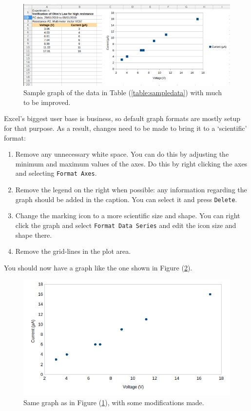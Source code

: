 \begin{figure}[!htb]
    \centering
    \includegraphics[scale=0.75]{figs/samplegraph1.png}
    \caption{Sample graph of the data in Table (\ref{table:sampledata}) with much to be improved.}
    \label{fig:samplegraph1}
\end{figure}


Excel's biggest user base is business, so default graph formats are mostly setup for that purpose. As a result, changes need to be made to bring it to a `scientific' format: \begin{enumerate}
    \item Remove any unnecessary white space. You can do this by adjusting the minimum and maximum values of the axes. Do this by right clicking the axes and selecting \texttt{Format Axes}.
    
    \item Remove the legend on the right when possible: any information regarding the graph should be added in the caption. You can select it and press \texttt{Delete}. 
    
    \item Change the marking icon to a more scientific size and shape. You can right click the graph and select \texttt{Format Data Series} and edit the icon size and shape there.
    
    \item Remove the grid-lines in the plot area.
\end{enumerate}

You should now have a graph like the one shown in Figure (\ref{fig:samplegraph2}).

\begin{figure}[!htb]
    \centering
    \includegraphics[scale=0.8]{figs/samplegraph2.png}
    \caption{Same graph as in Figure (\ref{fig:samplegraph1}), with some modifications made.}
    \label{fig:samplegraph2}
\end{figure}


